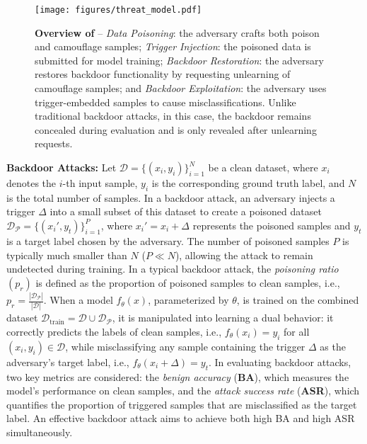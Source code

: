 \begin{figure*}[!t]
	\centering
	\texttt{[image: figures/threat\_model.pdf]}
	\caption{\textbf{Overview of \methodname} -- \protect{} \textit{Data Poisoning}: the adversary crafts both poison and camouflage samples; \protect{} \textit{Trigger Injection}: the poisoned data is submitted for model training; \protect{} \textit{Backdoor Restoration}: the adversary restores backdoor functionality by requesting unlearning of camouflage samples; and \protect{} \textit{Backdoor Exploitation}: the adversary uses trigger-embedded samples to cause misclassifications. Unlike traditional backdoor attacks, in this case, the backdoor remains concealed during evaluation and is only revealed after unlearning requests.}
	\label{fig:threat_model}
\end{figure*}

\noindent \textbf{Backdoor Attacks:} Let $\mathcal{D} = \{(x_i, y_i)\}_{i=1}^N$ be a clean dataset, where $x_i$ denotes the $i$-th input sample, $y_i$ is the corresponding ground truth label, and $N$ is the total number of samples. In a backdoor attack, an adversary injects a trigger $\Delta$ into a small subset of this dataset to create a poisoned dataset $\mathcal{D}_{\mathcal{P}} = \{(x_i', y_t)\}_{i=1}^P$, where $x_i' = x_i + \Delta$ represents the poisoned samples and $y_t$ is a target label chosen by the adversary. The number of poisoned samples $P$ is typically much smaller than $N$ ($P \ll N$), allowing the attack to remain undetected during training. In a typical backdoor attack, the \textit{poisoning ratio} $(p_{r})$ is defined as the proportion of poisoned samples to clean samples, i.e., $p_{r} = \frac{|\mathcal{D}_{\mathcal{P}}|}{|\mathcal{D}|}$. When a model $f_{\theta}(x)$, parameterized by $\theta$, is trained on the combined dataset $\mathcal{D}_{\text{train}} = \mathcal{D} \cup \mathcal{D}_{\mathcal{P}}$, it is manipulated into learning a dual behavior: it correctly predicts the labels of clean samples, i.e., $f_{\theta}(x_i) = y_i$ for all $(x_i, y_i) \in \mathcal{D}$, while misclassifying any sample containing the trigger $\Delta$ as the adversary's target label, i.e., $f_{\theta}(x_i + \Delta) = y_t$. In evaluating backdoor attacks, two key metrics are considered: the \emph{benign accuracy} (\textbf{BA}), which measures the model's performance on clean samples, and the \emph{attack success rate} (\textbf{ASR}), which quantifies the proportion of triggered samples that are misclassified as the target label. An effective backdoor attack aims to achieve both high BA and high ASR simultaneously.

